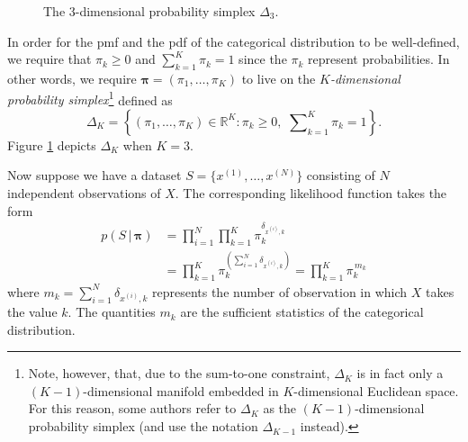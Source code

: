\documentclass[final,3p,times,twocolumn]{elsarticle}
\let\bs\boldsymbol
\begin{document}
\begin{figure}
\caption{The 3-dimensional probability simplex $\Delta_3$.}
\label{fig:simplex}
\end{figure}


In order for the pmf and the pdf of the categorical distribution to be well-defined, we require that $\pi_k \geq 0$ and $\sum_{k=1}^K \pi_k = 1$ since the $\pi_k$ represent probabilities.
In other words, we require $\bs \pi = (\pi_1,\dots,\pi_K)$ to live on the \emph{$K$-dimensional probability simplex}\footnote{Note, however, that, due to the sum-to-one constraint, $\Delta_K$ is in fact only a $(K-1)$-dimensional manifold embedded in $K$-dimensional Euclidean space.
For this reason, some authors refer to $\Delta_K$ as the $(K-1)$-dimensional probability simplex (and use the notation $\Delta_{K-1}$ instead).}
defined as
\begin{equation*}
\Delta_K = \left\{(\pi_1,\dots,\pi_K) \in \mathbb{R}^K : \pi_k \geq 0,\,\, \sum \nolimits _{k=1}^K \pi_k = 1\right\}.
\end{equation*}
Figure \ref{fig:simplex} depicts $\Delta_K$ when $K=3$.

Now suppose we have a dataset $S=\{ x^{(1)},\dots,x^{(N)} \}$ consisting of $N$ independent observations of $X$.
The corresponding likelihood function takes the form
\begin{equation}
\label{eqn:catlik}
\begin{split}
p(S\,|\,\bs \pi) &= \prod_{i=1}^N \prod_{k=1}^K \pi_k^{\delta_{x^{(i)},k}} \\ &= \prod_{k=1}^K \pi_k^{\left(\sum_{i=1}^N \delta_{x^{(i)},k}\right)} = \prod_{k=1}^K \pi_k^{\,m_k}
\end{split}
\end{equation}
where $m_k = \sum_{i=1}^N \delta_{x^{(i)}, k}$ represents the number of observation in which $X$ takes the value $k$.
The quantities $m_k$ are the sufficient statistics of the categorical distribution.
\end{document}

